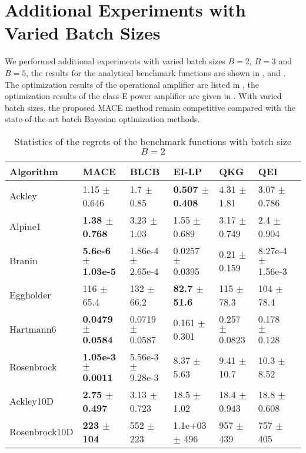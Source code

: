 \section{Additional Experiments with Varied Batch Sizes}

We performed additional experiments with varied batch sizes $B = 2$, $B = 3$
and $B = 5$, the results for the analytical benchmark functions are shown in ,
 and . The
optimization results of the operational amplifier are listed in
, the optimization results of the class-E power
amplifier are given in . With
varied batch sizes, the proposed MACE method remain competitive compared with
the state-of-the-art batch Bayesian optimization methods.

\begin{table*}[!htb]
    \centering
    \caption{Statistics of the regrets of the benchmark functions with batch size $B=2$}
    \label{tab:result_analytical_b2}
    \begin{tabular}{lllllll}
        \toprule
        Algorithm     & MACE                                   & BLCB                       & EI-LP                        & QKG                    & QEI                              \\ 
        \midrule
        Ackley        & 1.15             $\pm$  0.646    &  1.7       $\pm$  0.85      &  \textbf{0.507  $\pm$ 0.408}   &  4.31   $\pm$  1.81    &  3.07      $\pm$  0.786    \\
        Alpine1       & \textbf{1.38     $\pm$  0.768}   &  3.23      $\pm$  1.03      &  1.55           $\pm$ 0.689    &  3.17   $\pm$  0.749   &  2.4       $\pm$  0.904    \\
        Branin        & \textbf{5.6e-6   $\pm$  1.03e-5} &  1.86e-4   $\pm$  2.65e-4   &  0.0257         $\pm$ 0.0395   &  0.21   $\pm$  0.159   &  8.27e-4   $\pm$  1.56e-3  \\
        Eggholder     & 116              $\pm$  65.4     &  132       $\pm$  66.2      &  \textbf{82.7   $\pm$ 51.6}    &  115    $\pm$  78.3    &  104       $\pm$  78.4     \\
        Hartmann6     & \textbf{0.0479   $\pm$  0.0584}  &  0.0719    $\pm$  0.0587    &  0.161          $\pm$ 0.301    &  0.257  $\pm$  0.0823  &  0.178     $\pm$  0.128    \\
        Rosenbrock    & \textbf{1.05e-3  $\pm$  0.0011}  &  5.56e-3   $\pm$  9.28e-3   &  8.37           $\pm$ 5.63     &  9.41   $\pm$  10.7    &  10.3      $\pm$  8.52     \\
        Ackley10D     & \textbf{2.75     $\pm$  0.497}   &  3.13      $\pm$  0.723     &  18.5           $\pm$ 1.02     &  18.4   $\pm$  0.943   &  18.8      $\pm$  0.608    \\
        Rosenbrock10D & \textbf{223      $\pm$  104}     &  552       $\pm$  223       &  1.1e+03        $\pm$ 496      &  957    $\pm$  439     &  757       $\pm$  405      \\
        \bottomrule
    \end{tabular}
\end{table*}

